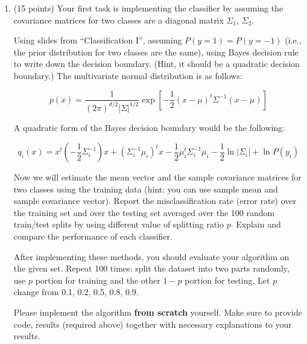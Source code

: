 \documentclass[a4paper,12pt,fleqn]{article}
\begin{document}
\begin{enumerate}
\item (15 points)
Your first task is implementing the classifier by assuming the covariance matrices for two classes are a diagonal matrix $\Sigma_1$, $\Sigma_ 2$. 

Using slides from ``Classification I'', assuming $P(y=1) = P(y=-1)$ (i.e., the prior distribution for two classes are the same), using Bayes decision rule to write down the decision boundary. (Hint, it should be a quadratic decision boundary.)
\vspace{.15in}
The multivariate normal distribution is as follows:

$$
p(x) = \frac{1}{(2\pi)^{d/2}|\Sigma|^{1/2}}\exp[-\frac{1}{2}(x-\mu)^t\Sigma^{-1}(x-\mu)]
$$

A quadratic form of the Bayes decision boundary would be the following:

$$
q_i(x) = x^t(-\frac{1}{2}\Sigma_{i}^{-1})x+(\Sigma_{i}^{-1}\mu_i)^tx-\frac{1}{2}\mu_i^t\Sigma_{i}^{-1}\mu_i-\frac{1}{2}\ln{|\Sigma_i|}+\ln{P(y_i)}
$$
\vspace{.15in}



Now we will estimate the mean vector and the sample covariance matrices for two classes using the training data (hint: you can use sample mean and sample covariance vector). Report the misclassification rate (error rate) over the training set and over the testing set averaged over the 100 random train/test splits by using different value of splitting ratio $p$. Explain and compare the performance of each classifier.

After implementing these methods, you should evaluate your algorithm on the given set. Repeat 100 times: split the dataset into two parts randomly, use $p$ portion for training and the other $1 - p$ portion for testing. Let $p$ change from 0.1, 0.2, 0.5, 0.8, 0.9.

Please implement the algorithm {\bf from scratch} yourself. Make sure to provide code, results (required above) together with necessary explanations to your results. 


\end{enumerate}
\end{document}
